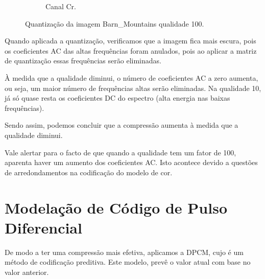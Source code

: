 \documentclass[a4paper, 12pt]{article}
\begin{document}
\begin{figure}[H]
\begin{subfigure}{0.3\textwidth}
                \caption{ Canal Cr.}
            \end{subfigure}
            \caption{\label{fig:my_label} Quantização da imagem Barn\_Mountains qualidade 100.}
        \end{figure}

         Quando aplicada a quantização, verificamos que a imagem fica mais escura, pois os coeficientes
         AC das altas frequências foram anulados, pois ao aplicar a matriz de quantização essas frequências
         serão eliminadas.

        À medida que a qualidade diminui, o número de coeficientes AC a zero aumenta, ou seja, um maior
        número de frequências altas serão eliminadas.
        Na qualidade 10, já só quase resta os coeficientes DC do espectro (alta energia nas baixas 
        frequências).

        Sendo assim, podemos concluir que a compressão aumenta à medida que a qualidade diminui.

        Vale alertar para o facto de que quando a qualidade tem um fator de 100, aparenta haver um aumento dos
        coeficientes AC. Isto acontece devido a questões de arredondamentos na codificação do modelo de cor.
        

\pagebreak
\section{Modelação de Código de Pulso Diferencial}
    De modo a ter uma compressão mais efetiva, aplicamos a DPCM, cujo é um método de codificação
    preditiva. Este modelo, prevê o valor atual com base no valor anterior.
\end{document}
